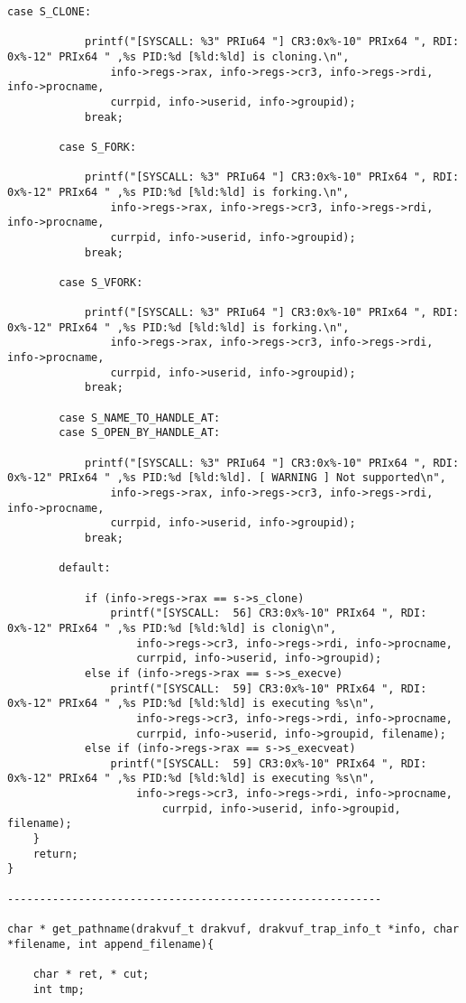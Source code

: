 {\begin{lstlisting}[style=CStyle]
		case S_CLONE:
		
			printf("[SYSCALL: %3" PRIu64 "] CR3:0x%-10" PRIx64 ", RDI: 0x%-12" PRIx64 " ,%s PID:%d [%ld:%ld] is cloning.\n",
				info->regs->rax, info->regs->cr3, info->regs->rdi, info->procname,
				currpid, info->userid, info->groupid);
			break;	
		
		case S_FORK:
		
			printf("[SYSCALL: %3" PRIu64 "] CR3:0x%-10" PRIx64 ", RDI: 0x%-12" PRIx64 " ,%s PID:%d [%ld:%ld] is forking.\n",
				info->regs->rax, info->regs->cr3, info->regs->rdi, info->procname,
				currpid, info->userid, info->groupid);
			break;	
		
		case S_VFORK:
		
			printf("[SYSCALL: %3" PRIu64 "] CR3:0x%-10" PRIx64 ", RDI: 0x%-12" PRIx64 " ,%s PID:%d [%ld:%ld] is forking.\n",
				info->regs->rax, info->regs->cr3, info->regs->rdi, info->procname,
				currpid, info->userid, info->groupid);
			break;	
		
		case S_NAME_TO_HANDLE_AT:
		case S_OPEN_BY_HANDLE_AT:
		
			printf("[SYSCALL: %3" PRIu64 "] CR3:0x%-10" PRIx64 ", RDI: 0x%-12" PRIx64 " ,%s PID:%d [%ld:%ld]. [ WARNING ] Not supported\n",
				info->regs->rax, info->regs->cr3, info->regs->rdi, info->procname,
				currpid, info->userid, info->groupid);
			break;
		
		default:
		
			if (info->regs->rax == s->s_clone)
				printf("[SYSCALL:  56] CR3:0x%-10" PRIx64 ", RDI: 0x%-12" PRIx64 " ,%s PID:%d [%ld:%ld] is clonig\n",
					info->regs->cr3, info->regs->rdi, info->procname,
					currpid, info->userid, info->groupid);
			else if (info->regs->rax == s->s_execve)
				printf("[SYSCALL:  59] CR3:0x%-10" PRIx64 ", RDI: 0x%-12" PRIx64 " ,%s PID:%d [%ld:%ld] is executing %s\n",
					info->regs->cr3, info->regs->rdi, info->procname,
					currpid, info->userid, info->groupid, filename);
			else if (info->regs->rax == s->s_execveat)
				printf("[SYSCALL:  59] CR3:0x%-10" PRIx64 ", RDI: 0x%-12" PRIx64 " ,%s PID:%d [%ld:%ld] is executing %s\n",
					info->regs->cr3, info->regs->rdi, info->procname,
						currpid, info->userid, info->groupid, filename);
	}
	return;
}

----------------------------------------------------------

char * get_pathname(drakvuf_t drakvuf, drakvuf_trap_info_t *info, char *filename, int append_filename){

	char * ret, * cut;
	int tmp;
	

\end{lstlisting}}
